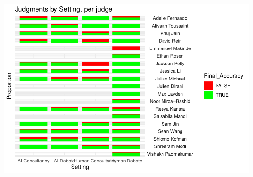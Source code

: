 \documentclass[
]{article}
\begin{document}
\includegraphics[width=1\linewidth]{debate-2309_files/figure-latex/quick ori stats cont-1}
\end{document}
